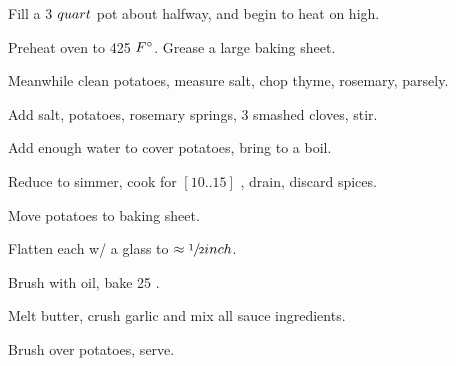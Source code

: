 \begin{preparation}
\item Fill a 3 $quart$ pot about halfway, and begin to heat on high.
\item Preheat oven to 425 $F^\circ$.
    Grease a large baking sheet.
\item Meanwhile clean potatoes, measure salt, chop thyme, rosemary, parsely.
\item Add salt, potatoes, rosemary springs, 3 smashed cloves, stir.
\item Add enough water to cover potatoes, bring to a boil.
\item Reduce to simmer, cook for $[10..15]$ \minute, drain, discard spices.
\item Move potatoes to baking sheet.
\item Flatten each w/ a glass to $\approx \sfrac{1}{2} inch$.
\item Brush with oil, bake 25 \minute.
\item Melt butter, crush garlic and mix all sauce ingredients.
\item Brush over potatoes, serve.
\end{preparation}

\recipeend%
